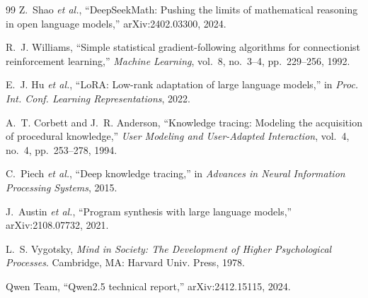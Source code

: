 \documentclass[conference]{IEEEtran}
\begin{document}
\begin{thebibliography}{99}
Z.~Shao \emph{et al.}, ``DeepSeekMath: Pushing the limits of mathematical
reasoning in open language models,'' arXiv:2402.03300, 2024.

R.~J. Williams, ``Simple statistical gradient-following algorithms for
connectionist reinforcement learning,'' \emph{Machine Learning}, vol.~8,
no.~3--4, pp.~229--256, 1992.

E.~J. Hu \emph{et al.}, ``LoRA: Low-rank adaptation of large language
models,'' in \emph{Proc. Int. Conf. Learning Representations}, 2022.

A.~T. Corbett and J.~R. Anderson, ``Knowledge tracing: Modeling the
acquisition of procedural knowledge,'' \emph{User Modeling and
User-Adapted Interaction}, vol.~4, no.~4, pp.~253--278, 1994.

C.~Piech \emph{et al.}, ``Deep knowledge tracing,'' in \emph{Advances in
Neural Information Processing Systems}, 2015.

J.~Austin \emph{et al.}, ``Program synthesis with large language models,''
arXiv:2108.07732, 2021.

L.~S. Vygotsky, \emph{Mind in Society: The Development of Higher
Psychological Processes}. Cambridge, MA: Harvard Univ. Press, 1978.

Qwen Team, ``Qwen2.5 technical report,'' arXiv:2412.15115, 2024.

\end{thebibliography}
\end{document}
